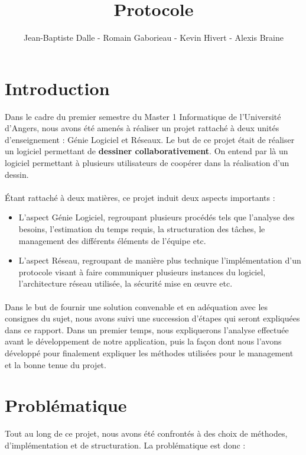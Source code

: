 \documentclass[a4paper,11pt]{article}
\title{Protocole}
\author{Jean-Baptiste Dalle - Romain Gaborieau - Kevin Hivert - Alexis Braine}
\date{}
\begin{document}
\maketitle

\clearpage

\tableofcontents

\clearpage

\section*{Introduction}
Dans le cadre du premier semestre du Master 1 Informatique de l'Université d'Angers, nous avons été amenés à réaliser un projet rattaché à deux unités d'enseignement : Génie Logiciel et Réseaux. Le but de ce projet était de réaliser un logiciel permettant de \textbf{dessiner collaborativement}. On entend par là un logiciel permettant à plusieurs utilisateurs de coopérer dans la réalisation d'un dessin.

\paragraph{} Étant rattaché à deux matières, ce projet induit deux aspects importants :

\begin{itemize}
	\item L'aspect Génie Logiciel, regroupant plusieurs procédés tels que l'analyse des besoins, l'estimation du temps requis, la structuration des tâches, le management des différents éléments de l'équipe etc.
	\item L'aspect Réseau, regroupant de manière plus technique l'implémentation d'un protocole visant à faire communiquer plusieurs instances du logiciel, l'architecture réseau utilisée, la sécurité mise en œuvre etc.
\end{itemize}

\paragraph{} Dans le but de fournir une solution convenable et en adéquation avec les consignes du sujet, nous avons suivi une succession d'étapes qui seront expliquées dans ce rapport. Dans un premier temps, nous expliquerons l'analyse effectuée avant le développement de notre application, puis la façon dont nous l'avons développé pour finalement expliquer les méthodes utilisées pour le management et la bonne tenue du projet.


\section*{Problématique}
Tout au long de ce projet, nous avons été confrontés à des choix de méthodes, d'implémentation et de structuration. La problématique est donc :
\end{document}
